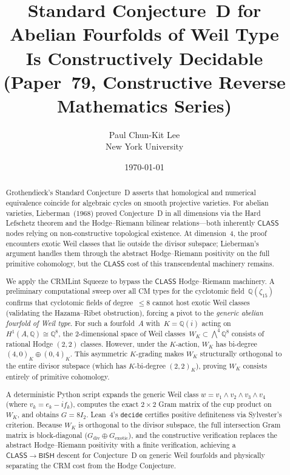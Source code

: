 \documentclass[11pt]{article}
\title{Standard Conjecture~D for Abelian Fourfolds of Weil Type\\
  Is Constructively Decidable\\[6pt]
  {\large (Paper~79, Constructive Reverse Mathematics Series)}}
\author{Paul Chun-Kit Lee\\
New York University}
\date{\today}
\theoremstyle{plain}
\theoremstyle{definition}
\theoremstyle{remark}
\newcommand{\Q}{\mathbb{Q}}
\newcommand{\BISH}{\mathsf{BISH}}
\newcommand{\CLASS}{\mathsf{CLASS}}
\begin{document}
\maketitle

\begin{abstract}
Grothendieck's Standard Conjecture~D asserts that homological and numerical
equivalence coincide for algebraic cycles on smooth projective varieties.
For abelian varieties, Lieberman~(1968) proved Conjecture~D in all
dimensions via the Hard Lefschetz theorem and the Hodge--Riemann bilinear
relations---both inherently $\CLASS$ nodes relying on non-constructive
topological existence.  At dimension~4, the proof encounters exotic Weil
classes that lie outside the divisor subspace; Lieberman's argument handles
them through the abstract Hodge--Riemann positivity on the full primitive
cohomology, but the $\CLASS$ cost of this transcendental machinery remains.

We apply the CRMLint Squeeze to bypass the $\CLASS$ Hodge--Riemann
machinery.  A preliminary computational
sweep over all CM types for the cyclotomic field~$\Q(\zeta_{15})$ confirms that
cyclotomic fields of degree~$\leq 8$ cannot host exotic Weil classes (validating
the Hazama--Ribet obstruction), forcing a pivot to the \emph{generic abelian
fourfold of Weil type}.  For such a fourfold~$A$ with~$K = \Q(i)$ acting
on~$H^1(A,\Q) \cong \Q^8$, the 2-dimensional space of Weil
classes~$W_K \subset \bigwedge^4\Q^8$ consists of rational Hodge $(2,2)$
classes.  However, under the $K$-action, $W_K$ has bi-degree
$(4,0)_K \oplus (0,4)_K$.  This asymmetric $K$-grading makes $W_K$
structurally orthogonal to the entire divisor subspace (which has
$K$-bi-degree $(2,2)_K$), proving $W_K$ consists entirely of primitive
cohomology.

A deterministic Python script expands the generic Weil class
$w = v_1\wedge v_2\wedge v_3\wedge v_4$ (where $v_k = e_k - if_k$), computes
the exact $2\times 2$ Gram matrix of the cup product on~$W_K$, and obtains
$G = 8I_2$.  Lean~4's \texttt{decide} certifies positive definiteness
via Sylvester's criterion.  Because $W_K$ is orthogonal to the divisor
subspace, the full intersection Gram matrix is block-diagonal
($G_{\mathrm{div}} \oplus G_{\mathrm{exotic}}$), and the constructive
verification replaces the abstract Hodge--Riemann positivity with a finite verification,
achieving a $\CLASS \to \BISH$ descent for Conjecture~D on generic Weil
fourfolds and physically separating the CRM cost from the Hodge Conjecture.
\end{abstract}
\end{document}
